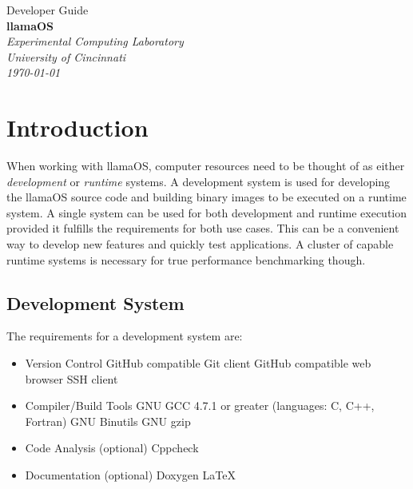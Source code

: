 \documentclass[draft]{article}
\begin{document}

\begin{titlepage}
\raggedleft
{\huge{Developer Guide}\\[1.0in]}
{\Huge{\textbf{llamaOS}}\\[0.125in]}
{\Large{}}
\vfill
\itshape
Experimental Computing Laboratory\\
University of Cincinnati\\[0.125in]
\today
\end{titlepage}


\tableofcontents
\clearpage


\section{Introduction}

When working with llamaOS, computer resources need to be thought of as either 
\emph{development} or \emph{runtime} systems.  A development system is used for 
developing the llamaOS source code and building binary images to be executed on 
a runtime system.  A single system can be used for both development and runtime 
execution provided it fulfills the requirements for both use cases.  This can 
be a convenient way to develop new features and quickly test applications.  A 
cluster of capable runtime systems is necessary for true performance 
benchmarking though.

\subsection{Development System}

The requirements for a development system are:

\begin{itemize}
  \item Version Control
    \subitem GitHub compatible Git client
    \subitem GitHub compatible web browser
    \subitem SSH client
  \item Compiler/Build Tools
    \subitem GNU GCC 4.7.1 or greater (languages: C, C++, Fortran)
    \subitem GNU Binutils
    \subitem GNU gzip
  \item Code Analysis (optional)
    \subitem Cppcheck
  \item Documentation (optional)
    \subitem Doxygen
    \subitem \LaTeX
\end{itemize}
\end{document}
